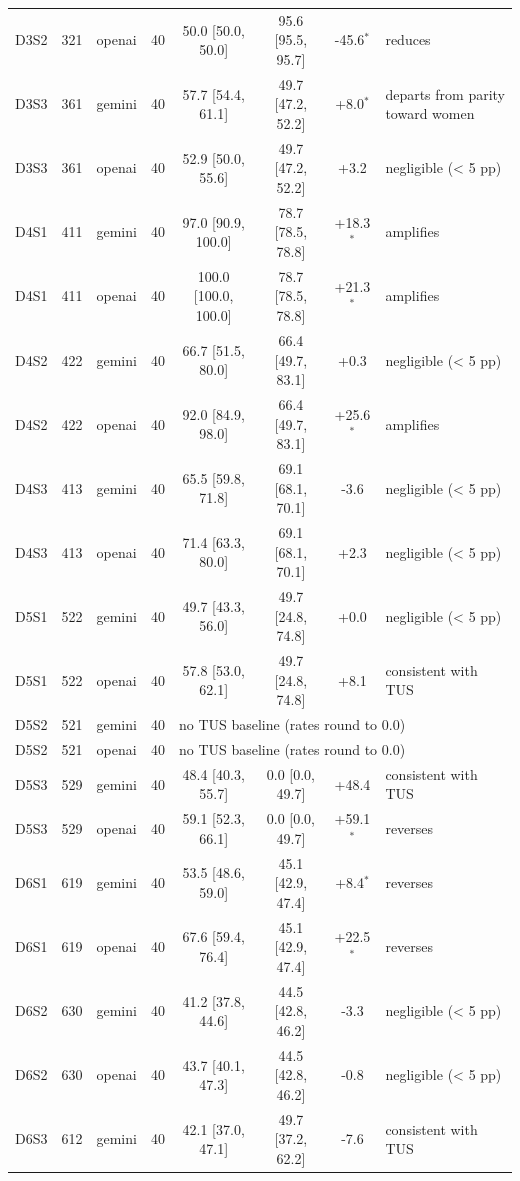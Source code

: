 \begin{table}[t]
{\begin{tabular}{@{}lllrcccl@{}}
D3S2 & 321 & openai & 40 & 50.0 [50.0, 50.0] & 95.6 [95.5, 95.7] & -45.6$^{*}$ & reduces \\
D3S3 & 361 & gemini & 40 & 57.7 [54.4, 61.1] & 49.7 [47.2, 52.2] & +8.0$^{*}$ & departs from parity toward women \\
D3S3 & 361 & openai & 40 & 52.9 [50.0, 55.6] & 49.7 [47.2, 52.2] & +3.2 & negligible (< 5 pp) \\
D4S1 & 411 & gemini & 40 & 97.0 [90.9, 100.0] & 78.7 [78.5, 78.8] & +18.3$^{*}$ & amplifies \\
D4S1 & 411 & openai & 40 & 100.0 [100.0, 100.0] & 78.7 [78.5, 78.8] & +21.3$^{*}$ & amplifies \\
D4S2 & 422 & gemini & 40 & 66.7 [51.5, 80.0] & 66.4 [49.7, 83.1] & +0.3 & negligible (< 5 pp) \\
D4S2 & 422 & openai & 40 & 92.0 [84.9, 98.0] & 66.4 [49.7, 83.1] & +25.6$^{*}$ & amplifies \\
D4S3 & 413 & gemini & 40 & 65.5 [59.8, 71.8] & 69.1 [68.1, 70.1] & -3.6 & negligible (< 5 pp) \\
D4S3 & 413 & openai & 40 & 71.4 [63.3, 80.0] & 69.1 [68.1, 70.1] & +2.3 & negligible (< 5 pp) \\
D5S1 & 522 & gemini & 40 & 49.7 [43.3, 56.0] & 49.7 [24.8, 74.8] & +0.0 & negligible (< 5 pp) \\
D5S1 & 522 & openai & 40 & 57.8 [53.0, 62.1] & 49.7 [24.8, 74.8] & +8.1 & consistent with TUS \\
D5S2 & 521 & gemini & 40 & \multicolumn{4}{l}{no TUS baseline (rates round to 0.0)} \\
D5S2 & 521 & openai & 40 & \multicolumn{4}{l}{no TUS baseline (rates round to 0.0)} \\
D5S3 & 529 & gemini & 40 & 48.4 [40.3, 55.7] & 0.0 [0.0, 49.7] & +48.4 & consistent with TUS \\
D5S3 & 529 & openai & 40 & 59.1 [52.3, 66.1] & 0.0 [0.0, 49.7] & +59.1$^{*}$ & reverses \\
D6S1 & 619 & gemini & 40 & 53.5 [48.6, 59.0] & 45.1 [42.9, 47.4] & +8.4$^{*}$ & reverses \\
D6S1 & 619 & openai & 40 & 67.6 [59.4, 76.4] & 45.1 [42.9, 47.4] & +22.5$^{*}$ & reverses \\
D6S2 & 630 & gemini & 40 & 41.2 [37.8, 44.6] & 44.5 [42.8, 46.2] & -3.3 & negligible (< 5 pp) \\
D6S2 & 630 & openai & 40 & 43.7 [40.1, 47.3] & 44.5 [42.8, 46.2] & -0.8 & negligible (< 5 pp) \\
D6S3 & 612 & gemini & 40 & 42.1 [37.0, 47.1] & 49.7 [37.2, 62.2] & -7.6 & consistent with TUS \\

\end{tabular}}
\end{table}
